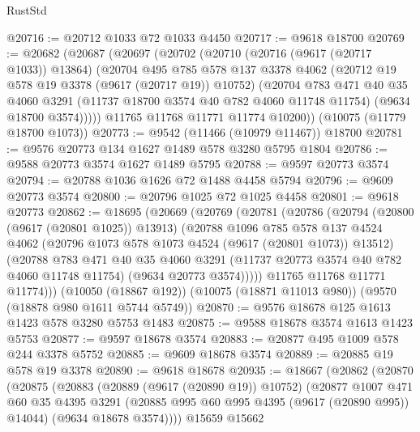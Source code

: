 \begin{lexlean}{RustStd}
\begin{coremodule}
{\begin{coremodule}
{{{{{{{{{{{{{{{{{{{{{{{{{{{{{{{{{@20716 := @20712 @1033 @72 @1033 @4450
@20717 := @9618 @18700
@20769 := @20682
    (@20687
      (@20697
        (@20702
          (@20710
            (@20716 (@9617 (@20717 @1033)) @13864)
            (@20704
              @495
              @785
              @578
              @137
              @3378
              @4062
              (@20712 @19 @578 @19 @3378 (@9617 (@20717 @19)) @10752)
              (@20704
                @783
                @471
                @40
                @35
                @4060
                @3291
                (@11737 @18700 @3574 @40 @782 @4060 @11748 @11754)
                (@9634 @18700 @3574)))))
        @11765
        @11768
        @11771
        @11774
        @10200))
    (@10075 (@11779 @18700 @1073))
@20773 := @9542 (@11466 (@10979 @11467)) @18700
@20781 := @9576 @20773 @134 @1627 @1489 @578 @3280 @5795 @1804
@20786 := @9588 @20773 @3574 @1627 @1489 @5795
@20788 := @9597 @20773 @3574
@20794 := @20788 @1036 @1626 @72 @1488 @4458 @5794
@20796 := @9609 @20773 @3574
@20800 := @20796 @1025 @72 @1025 @4458
@20801 := @9618 @20773
@20862 := @18695
    (@20669
      (@20769
        (@20781
          (@20786
            (@20794
              (@20800 (@9617 (@20801 @1025)) @13913)
              (@20788
                @1096
                @785
                @578
                @137
                @4524
                @4062
                (@20796 @1073 @578 @1073 @4524 (@9617 (@20801 @1073)) @13512)
                (@20788
                  @783
                  @471
                  @40
                  @35
                  @4060
                  @3291
                  (@11737 @20773 @3574 @40 @782 @4060 @11748 @11754)
                  (@9634 @20773 @3574)))))
          @11765
          @11768
          @11771
          @11774)))
    (@10050 (@18867 @192))
    (@10075 (@18871 @11013 @980))
    (@9570 (@18878 @980 @1611 @5744 @5749))
@20870 := @9576 @18678 @125 @1613 @1423 @578 @3280 @5753 @1483
@20875 := @9588 @18678 @3574 @1613 @1423 @5753
@20877 := @9597 @18678 @3574
@20883 := @20877 @495 @1009 @578 @244 @3378 @5752
@20885 := @9609 @18678 @3574
@20889 := @20885 @19 @578 @19 @3378
@20890 := @9618 @18678
@20935 := @18667
    (@20862
      (@20870
        (@20875
          (@20883
            (@20889 (@9617 (@20890 @19)) @10752)
            (@20877
              @1007
              @471
              @60
              @35
              @4395
              @3291
              (@20885 @995 @60 @995 @4395 (@9617 (@20890 @995)) @14044)
              (@9634 @18678 @3574))))
        @15659
        @15662
}}}}}}}}}}}}}}}}}}}}}}}}}}}}}}}}}
\end{coremodule}}
\end{coremodule}
\end{lexlean}
